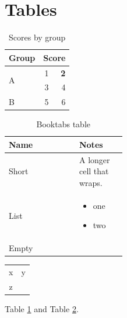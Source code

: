 \documentclass{article}
\begin{document}
\section{Tables}
\begin{table}[h]
\centering
\caption{Scores by group}\label{tab:scores}
\begin{tabular}{|l|c|r|}
\hline
Group & \multicolumn{2}{c|}{Score} \\
\hline
\multirow{2}{*}{A} & 1 & \textbf{2} \\
 & 3 & 4 \\
\hline
B & 5 & 6 \\
\hline
\end{tabular}
\end{table}

\begin{table}[h]
\centering
\begin{tabular}{lp{0.4\linewidth}}
\toprule
Name & Notes \\
\midrule
Short & A longer cell that wraps. \\
List &
\begin{itemize}
\item one
\item two
\end{itemize} \\
Empty & \\
\bottomrule
\end{tabular}
\caption{Booktabs table}\label{tab:notes}
\end{table}

\begin{tabular}{cc}
x & y \\
z
\end{tabular}

Table \ref{tab:scores} and Table \ref{tab:notes}.
\end{document}
